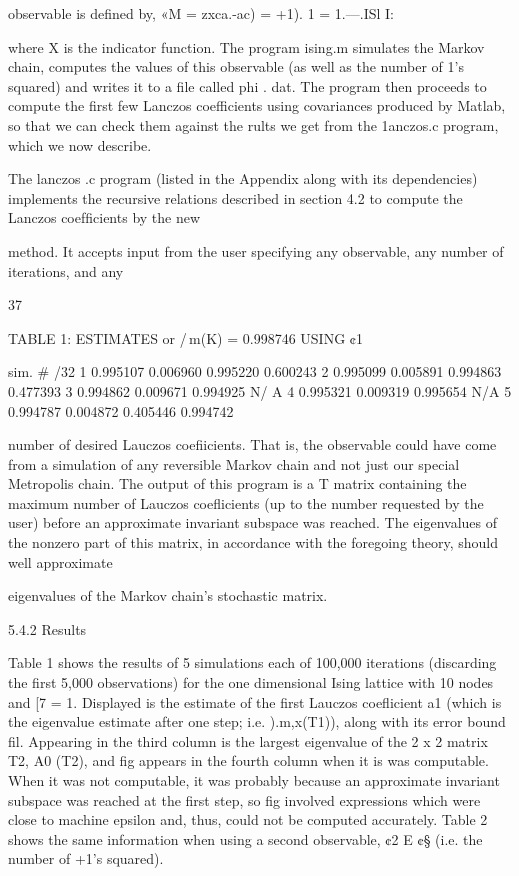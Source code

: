 {observable is deﬁned by,
«M = zxca.-ac) = +1). 1 = 1.---.ISl
I:

where X is the indicator function. The program ising.m simulates the Markov chain, computes the
values of this observable (as well as the number of 1’s squared) and writes it to a ﬁle called phi . dat.
The program then proceeds to compute the ﬁrst few Lanczos coefficients using covariances produced
by Matlab, so that we can check them against the rults we get from the 1anczos.c program,
which we now describe.

The lanczos .c program (listed in the Appendix along with its dependencies) implements
the recursive relations described in section 4.2 to compute the Lanczos coefﬁcients by the new

method. It accepts input from the user specifying any observable, any number of iterations, and any

37

TABLE 1: ESTIMATES or /\,m(K) = 0.998746 USING ¢1

  
   
  
  
  
 

     
 

        
  
  

    
   
    
 

      
   
   

   

sim. # /32
1 0.995107 0.006960 0.995220 0.600243
2 0.995099 0.005891 0.994863 0.477393
3 0.994862 0.009671 0.994925 N/ A
4 0.995321 0.009319 0.995654 N/A
5 0.994787 0.004872 0.405446 0.994742

number of desired Lauczos coeﬁicients. That is, the observable could have come from a simulation
of any reversible Markov chain and not just our special Metropolis chain. The output of this
program is a T matrix containing the maximum number of Lauczos coeﬂicients (up to the number
requested by the user) before an approximate invariant subspace was reached. The eigenvalues of
the nonzero part of this matrix, in accordance with the foregoing theory, should well approximate

eigenvalues of the Markov chain’s stochastic matrix.

5.4.2 Results

Table 1 shows the results of 5 simulations each of 100,000 iterations (discarding the ﬁrst
5,000 observations) for the one dimensional Ising lattice with 10 nodes and [7 = 1. Displayed is
the estimate of the ﬁrst Lauczos coeﬂicient a1 (which is the eigenvalue estimate after one step; i.e.
).m,x(T1)), along with its error bound ﬁl. Appearing in the third column is the largest eigenvalue of
the 2 x 2 matrix T2, A0 (T2), and ﬁg appears in the fourth column when it is was computable. When
it was not computable, it was probably because an approximate invariant subspace was reached
at the ﬁrst step, so ﬁg involved expressions which were close to machine epsilon and, thus, could
not be computed accurately. Table 2 shows the same information when using a second observable,
¢2 E ¢§ (i.e. the number of +1’s squared).

}
